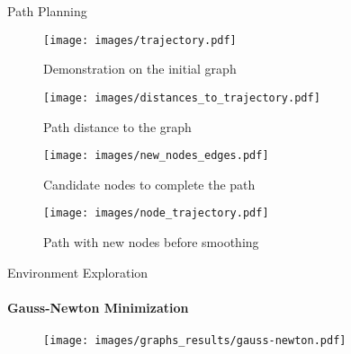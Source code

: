 \documentclass[aspectratio=169]{beamer}
\begin{document}
\begin{frame}{Path Planning}
	\begin{minipage}{0.25\linewidth}	
		\begin{figure}[h!]
			\texttt{[image: images/trajectory.pdf]}
			\caption{Demonstration on the initial graph}
			\label{fig:Path_on_graph}
		\end{figure}
	\end{minipage}\hfill
	\begin{minipage}{0.25\linewidth}	
		\begin{figure}[h!]
			\texttt{[image: images/distances\_to\_trajectory.pdf]}
			\caption{Path distance to the graph}
			\label{fig:distances_to_graph}
		\end{figure}
	\end{minipage}\hfill		
	\begin{minipage}{0.25\linewidth}	
		\begin{figure}[h!]
			\texttt{[image: images/new\_nodes\_edges.pdf]}
			\caption{Candidate nodes to complete the path}
			\label{fig:node_candidates}
		\end{figure}
	\end{minipage}\hfill
	\begin{minipage}{0.25\linewidth}	
		\begin{figure}[h!]
			\texttt{[image: images/node\_trajectory.pdf]}
			\caption{Path with new nodes before smoothing}
			\label{fig:new_nodes}
		\end{figure}
	\end{minipage}		
\end{frame}

\begin{frame}{Environment Exploration}
	\framesubtitle{Gauss-Newton Minimization}
	\vspace{-0.5cm}
	\begin{minipage}{\linewidth}	
		\begin{figure}[h!]
			\texttt{[image: images/graphs\_results/gauss-newton.pdf]}
			\label{fig:object_representation}
		\end{figure}
	\end{minipage}
\end{frame}
\end{document}
